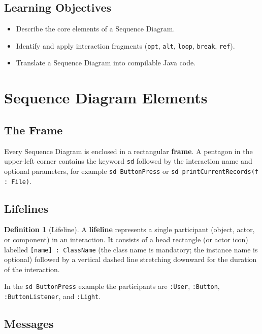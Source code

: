 \documentclass[11pt, a4paper, notitlepage]{report}
\theoremstyle{definition}
\newtheorem{definition}[theorem]{Definition}
\theoremstyle{remark}
\theoremstyle{definition}
\begin{document}
\subsection{Learning Objectives}
\begin{itemize}
  \item Describe the core elements of a Sequence Diagram.
  \item Identify and apply interaction fragments (\texttt{opt}, \texttt{alt},
        \texttt{loop}, \texttt{break}, \texttt{ref}).
  \item Translate a Sequence Diagram into compilable Java code.
\end{itemize}

\section{Sequence Diagram Elements}
\label{sec:ch7-elements}

\subsection{The Frame}
\label{subsec:ch7-frame}

Every Sequence Diagram is enclosed in a rectangular \textbf{frame}. A pentagon
in the upper-left corner contains the keyword \texttt{sd} followed by the
interaction name and optional parameters, for example \texttt{sd ButtonPress}
or \texttt{sd printCurrentRecords(f : File)}.

\subsection{Lifelines}
\label{subsec:ch7-lifelines}

\begin{definition}[Lifeline]
\label{def:ch7-lifeline}
A \textbf{lifeline} represents a single participant (object, actor, or
component) in an interaction. It consists of a head rectangle (or actor icon)
labelled \texttt{[name] : ClassName} (the class name is mandatory; the instance
name is optional) followed by a vertical dashed line stretching downward for
the duration of the interaction.
\end{definition}

In the \texttt{sd ButtonPress} example the participants are \texttt{:User},
\texttt{:Button}, \texttt{:ButtonListener}, and \texttt{:Light}.

\subsection{Messages}
\label{subsec:ch7-messages}
\end{document}
